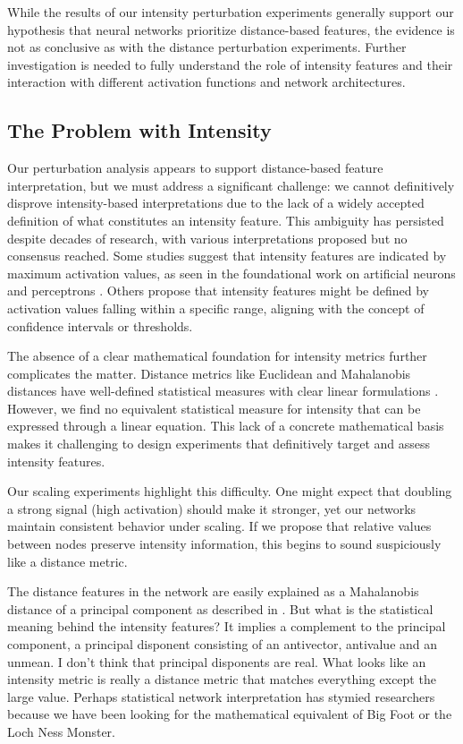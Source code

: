 While the results of our intensity perturbation experiments generally support our hypothesis that neural networks prioritize distance-based features, the evidence is not as conclusive as with the distance perturbation experiments. Further investigation is needed to fully understand the role of intensity features and their interaction with different activation functions and network architectures.

\subsection{The Problem with Intensity}

Our perturbation analysis appears to support distance-based feature interpretation, but we must address a significant challenge: we cannot definitively disprove intensity-based interpretations due to the lack of a widely accepted definition of what constitutes an intensity feature. This ambiguity has persisted despite decades of research, with various interpretations proposed but no consensus reached. Some studies suggest that intensity features are indicated by maximum activation values, as seen in the foundational work on artificial neurons and perceptrons \citep{mcculloch1943logical, rosenblatt1958perceptron}. Others propose that intensity features might be defined by activation values falling within a specific range, aligning with the concept of confidence intervals or thresholds.

The absence of a clear mathematical foundation for intensity metrics further complicates the matter. Distance metrics like Euclidean and Mahalanobis distances have well-defined statistical measures with clear linear formulations \citep{deza2009encyclopedia, mahalanobis1936generalized}. However, we find no equivalent statistical measure for intensity that can be expressed through a linear equation. This lack of a concrete mathematical basis makes it challenging to design experiments that definitively target and assess intensity features.

Our scaling experiments highlight this difficulty. One might expect that doubling a strong signal (high activation) should make it stronger, yet our networks maintain consistent behavior under scaling. If we propose that relative values between nodes preserve intensity information, this begins to sound suspiciously like a distance metric.

The distance features in the network are easily explained as a Mahalanobis distance of a principal component as described in \citep{oursland2024interpreting}. But what is the statistical meaning behind the intensity features? It implies a complement to the principal component, a principal disponent consisting of an antivector, antivalue and an unmean. I don't think that principal disponents are real. What looks like an intensity metric is really a distance metric that matches everything except the large value. Perhaps statistical network interpretation has stymied researchers because we have been looking for the mathematical equivalent of Big Foot or the Loch Ness Monster.